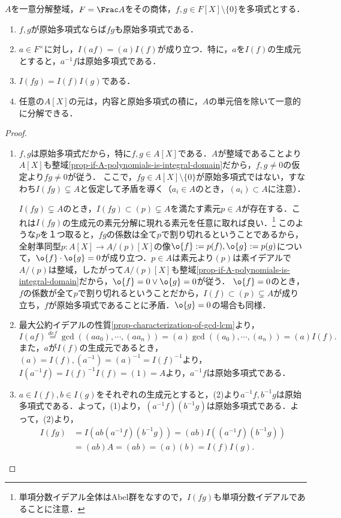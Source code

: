 \documentclass[uplatex,dvipdfmx]{jsreport}
\begin{document}
\begin{lemma}\label{lemma-functority-of-I}
    $A$を一意分解整域，$F=\Frac A$をその商体，$f,g\in F[X]\setminus\{0\}$を多項式とする．
    \begin{enumerate}
        \item $f,g$が原始多項式ならば$fg$も原始多項式である．
        \item $a\in F^\times$に対し，$I(af)=(a)I(f)$が成り立つ．特に，$a$を$I(f)$の生成元とすると，$a^{-1}f$は原始多項式である．
        \item $I(fg)=I(f)I(g)$である．
        \item 任意の$A[X]$の元は，内容と原始多項式の積に，$A$の単元倍を除いて一意的に分解できる．
    \end{enumerate}
\end{lemma}
\begin{proof}\mbox{}
    \begin{enumerate}
        \item $f,g$は原始多項式だから，特に$f,g\in A[X]$である．$A$が整域であることより$A[X]$も整域\ref{prop-if-A-polynomials-is-integral-domain}だから，$f,g\ne 0$の仮定より$fg\ne 0$が従う．
        ここで，$fg\in A[X]\setminus\{0\}$が原始多項式ではない，すなわち$I(fg)\subsetneq A$と仮定して矛盾を導く（$a_i\in A$のとき，$(a_i)\subset A$に注意）．

        $I(fg)\subsetneq A$のとき，$I(fg)\subset(p)\subsetneq A$を満たす素元$p\in A$が存在する．これは$I(fg)$の生成元の素元分解に現れる素元を任意に取れば良い．\footnote{単項分数イデアル全体はAbel群をなすので，$I(fg)$も単項分数イデアルであることに注意．}
        このような$p$を１つ取ると，$fg$の係数は全て$p$で割り切れるということであるから，全射準同型$p:A[X]\to A/(p)[X]$の像$\o{f}:=p(f),\o{g}:=p(g)$について，$\o{f}\cdot\o{g}=0$が成り立つ．$p\in A$は素元より$(p)$は素イデアルで$A/(p)$は整域，したがって$A/(p)[X]$も整域\ref{prop-if-A-polynomials-is-integral-domain}だから，$\o{f}=0\lor\o{g}=0$が従う．
        $\o{f}=0$のとき，$f$の係数が全て$p$で割り切れるということだから，$I(f)\subset(p)\subsetneq A$が成り立ち，$f$が原始多項式であることに矛盾．$\o{g}=0$の場合も同様．
        \item 最大公約イデアルの性質\ref{prop-characterization-of-gcd-lcm}より，
        \[I(af)\overset{def}{=}\gcd((aa_0),\cdots,(aa_n))=(a)\gcd((a_0),\cdots,(a_n))=(a)I(f).\]
        また，$a$が$I(f)$の生成元であるとき，$(a)=I(f),(a^{-1})=(a)^{-1}=I(f)^{-1}$より，$I(a^{-1}f)=I(f)^{-1}I(f)=(1)=A$より，$a^{-1}f$は原始多項式である．
        \item 
        $a\in I(f),b\in I(g)$をそれぞれの生成元とすると，(2)より$a^{-1}f,b^{-1}g$は原始多項式である．よって，(1)より，$(a^{-1}f)(b^{-1}g)$は原始多項式である．よって，(2)より，
        \begin{align*}
            I(fg)&=I(ab(a^{-1}f)(b^{-1}g))=(ab)I((a^{-1}f)(b^{-1}g))\\
            &=(ab)A=(ab)=(a)(b)=I(f)I(g).
        \end{align*}
    \end{enumerate}
\end{proof}
\end{document}
